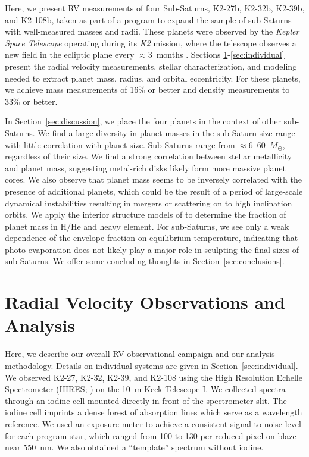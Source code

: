 \documentclass[preprint2]{aastex6}
\newcommand{\ktwo}{\textit{K2}\xspace}
\newcommand{\Me}{\ensuremath{M_{\oplus}}\xspace}
\begin{document}
Here, we present RV measurements of four Sub-Saturns, K2-27b, K2-32b, K2-39b, and K2-108b, taken as part of a program to expand the sample of sub-Saturns with well-measured masses and radii. These planets were observed by the {\em Kepler Space Telescope} \citep{Borucki10a} operating during its \ktwo mission, where the telescope observes a new field in the ecliptic plane every $\approx3$~months \citep{howell:2014}. Sections \ref{sec:rv}-\ref{sec:individual} present the radial velocity measurements, stellar characterization, and modeling needed to extract planet mass, radius, and orbital eccentricity. For these planets, we achieve mass measurements of 16\% or better and density measurements to 33\% or better. 

In Section~\ref{sec:discussion}, we place the four planets in the context of other sub-Saturns. We find a large diversity in planet masses in the sub-Saturn size range with little correlation with planet size. Sub-Saturns range from $\approx$6--60~\Me, regardless of their size. We find a strong correlation between stellar metallicity and planet mass, suggesting metal-rich disks likely form more massive planet cores. We also observe that planet mass seems to be inversely correlated with the presence of additional planets, which could be the result of  a period of large-scale dynamical instabilities resulting in mergers or scattering on to high inclination orbits. We apply the interior structure models of \citep{Lopez14} to determine the fraction of planet mass in H/He and heavy element. For sub-Saturns, we see only a weak dependence of the envelope fraction on equilibrium temperature, indicating that photo-evaporation does not likely play a major role in sculpting the final sizes of sub-Saturns. We offer some concluding thoughts in Section~\ref{sec:conclusions}.

\section{Radial Velocity Observations and Analysis}
\label{sec:rv}
Here, we describe our overall RV observational campaign and our analysis methodology. Details on individual systems are given in  Section~\ref{sec:individual}. We observed K2-27, K2-32, K2-39, and K2-108 using the High Resolution Echelle Spectrometer (HIRES; \citealt{Vogt94}) on the 10~m Keck Telescope I. We collected spectra through an iodine cell mounted directly in front of the spectrometer slit. The iodine cell imprints a dense forest of absorption lines which serve as a wavelength reference. We used an exposure meter to achieve a consistent signal to noise level for each program star, which ranged from 100 to 130 per reduced pixel on blaze near 550~nm. We also obtained a ``template'' spectrum without iodine. 
\end{document}
